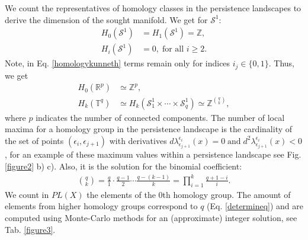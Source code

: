 \documentclass[runningheads,orivec]{llncs}
\begin{document}
We count the representatives of homology classes in the persistence landscapes to derive the dimension of the sought manifold. We get for $\mathcal{S}^1$:
\begin{align}
    H_0(\mathcal{S}^1) &= H_1(\mathcal{S}^1) = \mathbb{Z},\\
    H_i(\mathcal{S}^1) &= 0, \; \text{for all } i \geq 2.
\end{align}
Note, in Eq. \ref{homologykunneth} terms remain only for indices $i_{j} \in \{0,1\}$. Thus, we get
\begin{align}
    H_0(\mathbb{R}^p) &\simeq\mathbb{Z}^{p},\\
    \label{determineq}
    H_k(\mathbb{T}^{q}) &\simeq H_k(\mathcal{S}^{1}_{1} \times \cdots \times \mathcal{S}^{1}_{q}) \simeq \mathbb{Z}^{{q\choose{k}}},
\end{align}
where $p$ indicates the number of connected components. The number of local maxima for a homology group in the persistence landscape is the cardinality of the set of points $(\epsilon_i,\epsilon_{j+1})$ with derivatives $d\lambda^{\epsilon_i}_{\epsilon_{j+1}}(x) = 0 \; \text{and} \; d^2 \lambda^{\epsilon_i}_{\epsilon_{j+1}}(x) < 0$, for an example of these maximum values within a persistence landscape see Fig. \ref{figure2} b) c). Also, it is the solution for the binomial coefficient:
\begin{align}
     {q \choose k} = \frac{q}{1} \cdot \frac{q-1}{2} \cdots \frac{q-(k-1)}{k} = \prod_{i=1}^{k} \frac{q+1-i}{i}.
\end{align} 
We count in $PL(X)$ the elements of the $0$th homology group. The amount of elements from higher homology groups correspond to $q$ (Eq. \ref{determineq}) and are computed using Monte-Carlo methods for an (approximate) integer solution, see Tab. \ref{figure3}.
\end{document}
